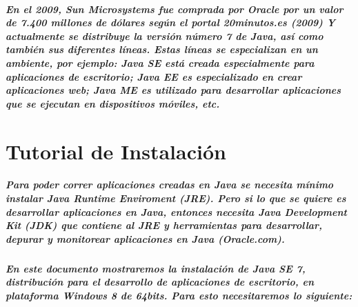 \documentclass[12pt]{book} %
\begin{document}
\paragraph{En el 2009, Sun Microsystems fue comprada por Oracle por un valor de 7.400 millones de dólares según el portal 20minutos.es (2009) Y actualmente se distribuye la versión número 7 de Java, así como también sus diferentes líneas. Estas líneas se especializan en un ambiente, por ejemplo: Java SE está creada especialmente para aplicaciones de escritorio; Java EE es especializado en crear aplicaciones web; Java ME es utilizado para desarrollar aplicaciones que se ejecutan en dispositivos móviles, etc. }



\chapter{Tutorial de Instalación}
\paragraph{Para poder correr aplicaciones creadas en Java se necesita mínimo instalar Java Runtime Enviroment (JRE). Pero si lo que se quiere es desarrollar aplicaciones en Java, entonces necesita Java Development Kit (JDK) que contiene al JRE y herramientas para desarrollar, depurar y monitorear aplicaciones en Java (Oracle.com).}
\paragraph{En este documento mostraremos la instalación de Java SE 7, distribución para el desarrollo de aplicaciones de escritorio, en plataforma Windows 8 de 64bits. Para esto necesitaremos lo siguiente:}
\end{document}
